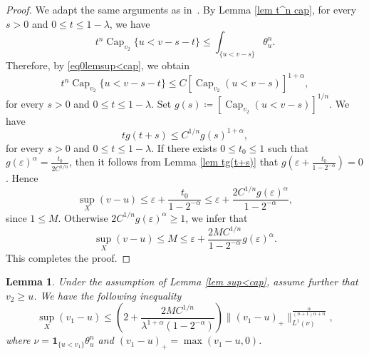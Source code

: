 \documentclass[a4paper,11pt]{amsart}
\numberwithin{equation}{section}
\newtheorem{lemma}[theorem]{Lemma}
\theoremstyle{definition}
\newcommand{\capacity}{\mathop{\mathrm{Cap}}\nolimits}
\begin{document}
\begin{proof} {We adapt the same arguments as in~\cite{eyssidieux2009singular}.}
	By Lemma \ref{lem t^n cap}, for every $s>0$ and $0\leq t\leq 1-\lambda$, we have
		$$t^n \capacity_{v_2}\{u<v-s-t\}\leq \int_{\{u<v-s\}}\theta_u^n.$$
		Therefore, by \eqref{eq0lemsup<cap}, we obtain
		$$t^n \capacity_{v_2}\{u<v-s-t\}\leq C[\capacity_{v_2}(u<v-s)]^{1+\alpha},$$
		for every $s>0$ and $0\leq t\leq 1-\lambda$. Set $g(s)\coloneqq\left[\capacity_{v_2}(u<v-s)\right]^{1/n}$. We have
		\begin{equation*}
			t g(t+s)\leq C^{1/n}  g(s)^{1+\alpha},
		\end{equation*}
	for every $s>0$ and $0\leq t\leq 1-\lambda$.	
	If there exists $0\leq t_0\leq 1$ such that $g(\varepsilon)^{\alpha}=\frac{t_0}{2 C^{1/n}}$, then
	it follows from Lemma \ref{lem tg(t+s)} that $g\left(\varepsilon+\frac{t_0}{1-2^{-\alpha}}\right)=0$. Hence
	$$\sup_X (v-u)\leq \varepsilon+\dfrac{t_0}{1-2^{-\alpha}}\leq\varepsilon+\dfrac{2 C^{1/n}g(\varepsilon)^{\alpha}}{1-2^{-\alpha}},$$
    since $1\leq M$.
	Otherwise $2C^{1/n}g(\varepsilon)^{\alpha}\geq 1$, we infer that
		$$\sup_X(v-u)\leq M 
		\leq\varepsilon+\dfrac{2 M C^{1/n}}{1-2^{-\alpha}}g(\varepsilon)^{\alpha}.$$
This completes the proof.
\end{proof}
\begin{lemma}\label{lem extend GZ12 prop 5.3} Under the assumption of Lemma \ref{lem sup<cap}, assume further that $v_2\geq u$. We have
the following
	inequality 
$$\sup_{X } (v_1-u)\leq \left(2+\dfrac{2 M C^{1/n}}{\lambda^{1+\alpha}(1-2^{-\alpha})}\right)\|(v_1-u)_+\|_{L^1(\nu)}^{\frac{\alpha}{(n+1)\alpha+n}},$$
where $\nu=\mathbf{1}_{\{u<v_1\}}\theta_u^n$ and $(v_1-u)_+=\max(v_1-u,0)$.
\end{lemma}
\end{document}
